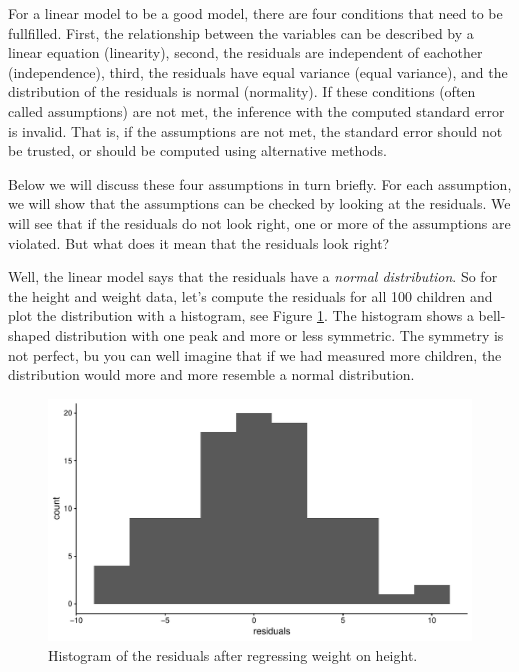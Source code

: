 \documentclass[]{book}\usepackage[]{graphicx}\usepackage[]{color}
\makeatletter
\def\maxwidth{ %
  \ifdim\Gin@nat@width>\linewidth
    \linewidth
  \else
    \Gin@nat@width
  \fi
}
\newenvironment{knitrout}{}{} %
\makeatother
\begin{document}
For a linear model to be a good model, there are four conditions that need to be fullfilled. First, the relationship between the variables can be described by a linear equation (linearity), second, the residuals are independent of eachother (independence), third, the residuals have equal variance (equal variance), and the distribution of the residuals is normal (normality). If these conditions (often called assumptions) are not met, the inference with the computed standard error is invalid. That is, if the assumptions are not met, the standard error should not be trusted, or should be computed using alternative methods. 

Below we will discuss these four assumptions in turn briefly. For each assumption, we will show that the assumptions can be checked by looking at the residuals. We will see that if the residuals do not look right, one or more of the assumptions are violated. But what does it mean that the residuals look right?

Well, the linear model says that the residuals have a \textit{normal distribution}. So for the height and weight data, let's compute the residuals for all 100 children and plot the distribution with a histogram, see Figure \ref{fig:ass_3}. The histogram shows a bell-shaped distribution with one peak and more or less symmetric. The symmetry is not perfect, bu you can well imagine that if we had measured more children, the distribution would more and more resemble a normal distribution. 

\begin{knitrout}
\color{fgcolor}\begin{figure}

{\centering \includegraphics[width=\maxwidth]{figure/ass_3-1} 

}

\caption[Histogram of the residuals after regressing weight on height]{Histogram of the residuals after regressing weight on height.}\label{fig:ass_3}
\end{figure}


\end{knitrout}
\end{document}
